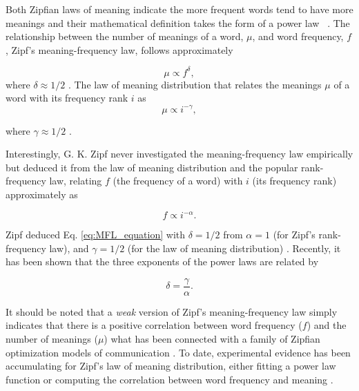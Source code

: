 \documentclass[10pt,letterpaper]{article}
\begin{document}
Both Zipfian laws of meaning indicate the more frequent words tend to have more meanings  and their mathematical definition takes the form of a power law ~\cite{Zipf1949, Zipf_MFL}. The relationship between the number of meanings of a word, $\mu$, and word frequency, $f$, Zipf's meaning-frequency law, follows approximately  

\begin{equation}
\mu \propto f^{\delta},
\label{eq:MFL_equation}
\end{equation}
where $\delta \approx 1/2$ \cite{Zipf_MFL, Ferrer2017, Baayen2005}. 
The law of meaning distribution that relates the meanings $\mu$ of a word with its frequency rank $i$ as
\begin{equation}
\mu \propto i^{-\gamma},
\label{eq:law_of_meaning_distribution_equation}
\end{equation}

where $\gamma \approx 1/2$ \cite{Ferrer2017, Ferrer2016}.

Interestingly, G. K. Zipf never investigated the meaning-frequency law empirically but deduced it from the law of meaning distribution \cite{Zipf_MFL, LC_2019} and the popular rank-frequency law, relating $f$ (the frequency of a word) with $i$ (its frequency rank) approximately as \cite{zipf1932selected,condon1928statistics} 

\begin{equation}
f \propto i^{-\alpha}.
\label{eq:word_frequency_law}
\end{equation}

Zipf deduced Eq. \ref{eq:MFL_equation} with $\delta = 1/2$ from $\alpha = 1$ (for Zipf's rank-frequency law), and $\gamma =1/2$ (for the law of meaning distribution) \cite{Zipf1949, Zipf_MFL}. Recently, it has been shown that the three exponents of the power laws are related by \cite{Ferrer2017, Ferrer2016}

\begin{equation}
\delta=\frac{\gamma}{\alpha}.
\label{eq:exponents}
\end{equation}

It should be noted that a \textit{weak} version of Zipf's meaning-frequency law simply indicates that there is a positive correlation between word frequency ($f$) and the number of meanings ($\mu$) what has been connected with a family of Zipfian optimization models of communication \cite{Carrera2021a}.
To date, experimental evidence has been accumulating for Zipf's law of meaning distribution, either fitting a power law function or computing the correlation between word frequency and meaning \cite{Baayen2005,bond2019testing, Casas2019, pilsen, Ilgen2007}.
\end{document}

